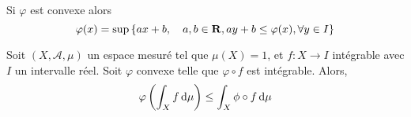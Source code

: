 \begin{prop}
Si $\varphi$ est convexe alors  \[
    \varphi(x)= \sup \left\{ ax+b, \quad  a,b \in  \mathbf R, ay+b\leq \varphi(x), \forall  y \in  I \right\} 
\] 
\end{prop}

\begin{prop}
    Soit $(X, \mathcal  A, \mu)$ un espace mesuré tel que $\mu(X)=1$, et $f:X\longrightarrow I$ intégrable avec $I$ un intervalle réel. Soit $\varphi$ convexe telle que  $\varphi\circ f$ est intégrable. Alors,  \[
        \varphi \left( \int_X f\mathop{}\!\mathrm d \mu \right) \leq  \int_X \phi\circ f\mathop{}\!\mathrm d \mu
    \] 
\end{prop}

